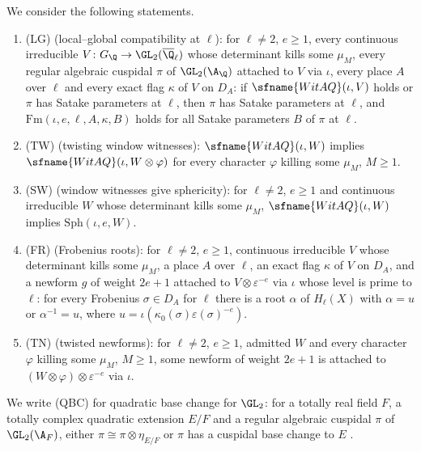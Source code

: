 \begin{definition}\label{pf:kato:def:locq}
We consider the following statements.
\begin{enumerate}[label=(\roman*)]
\item \textup{(LG)} (local--global compatibility at $\ell$): for $\ell\ne2$, $e\ge1$, every continuous irreducible
  $V\colon G_\Q\to\GL_2(\katoQlb)$ whose determinant kills some $\mu_M$, every regular algebraic cuspidal $\pi$ of
  $\GL_2(\A_\Q)$ attached to $V$ via $\iota$, every place $A$ over $\ell$ and every exact flag $\kappa$ of $V$ on $D_A$: if
  $\sfname{WitAQ}(\iota,V)$ holds or $\pi$ has Satake parameters at $\ell$, then $\pi$ has Satake parameters at $\ell$, and
  $\mathrm{Fm}(\iota,e,\ell,A,\kappa,B)$ holds for all Satake parameters $B$ of $\pi$ at $\ell$.
\item \textup{(TW)} (twisting window witnesses): $\sfname{WitAQ}(\iota,W)$ implies $\sfname{WitAQ}(\iota,W\otimes\varphi)$ for
  every character $\varphi$ killing some $\mu_M$, $M\ge1$.
\item \textup{(SW)} (window witnesses give sphericity): for $\ell\ne2$, $e\ge1$ and continuous irreducible $W$ whose
  determinant kills some $\mu_M$, $\sfname{WitAQ}(\iota,W)$ implies $\mathrm{Sph}(\iota,e,W)$.
\item \textup{(FR)} (Frobenius roots): for $\ell\ne2$, $e\ge1$, continuous irreducible $V$ whose determinant kills some
  $\mu_M$, a place $A$ over $\ell$, an exact flag $\kappa$ of $V$ on $D_A$, and a newform $g$ of weight $2e+1$
  attached to $V\otimes\varepsilon^{-e}$ via $\iota$ whose level is prime to $\ell$: for every Frobenius
  $\sigma\in D_A$ for $\ell$ there is a root $\alpha$ of $H_\ell(X)$ with $\alpha=u$ or $\alpha^{-1}=u$, where
  $u=\iota(\kappa_0(\sigma)\varepsilon(\sigma)^{-e})$.
\item \textup{(TN)} (twisted newforms): for $\ell\ne2$, $e\ge1$, admitted $W$ and every character $\varphi$ killing some
  $\mu_M$, $M\ge1$, some newform of weight $2e+1$ is attached to $(W\otimes\varphi)\otimes\varepsilon^{-e}$ via $\iota$.
\end{enumerate}
We write \textup{(QBC)} for quadratic base change for $\GL_2$: for a totally real field $F$, a totally complex quadratic
extension $E/F$ and a regular algebraic cuspidal $\pi$ of $\GL_2(\A_F)$, either $\pi\cong\pi\otimes\eta_{E/F}$ or $\pi$ has a
cuspidal base change to $E$ \cite{Langlands1980}.
\end{definition}

